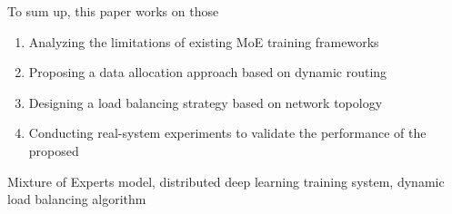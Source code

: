 \noindent To sum up, this paper works on those
\vspace{-12pt}
\begin{enumerate} \setlength{\itemsep}{0pt}
    \item Analyzing the limitations of existing MoE training frameworks
\item Proposing a data allocation approach based on dynamic routing
\item Designing a load balancing strategy based on network topology
\item Conducting real-system experiments to validate the performance of the proposed 
\end{enumerate}
\vspace{-12pt}


\vspace{1em}
 \quad Mixture of Experts model, distributed deep learning training system, dynamic load balancing algorithm

\clearpage
\endinput